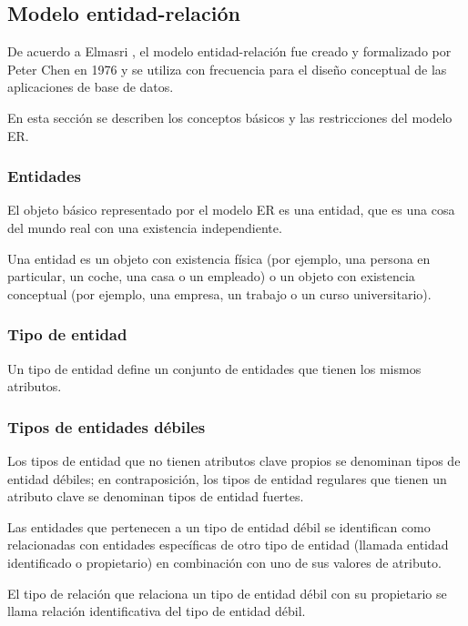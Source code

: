 
\subsection{Modelo entidad-relación}

De acuerdo a Elmasri \cite{ramez_elmasri_fundamentos_nodate}, el modelo entidad-relación fue creado y formalizado por Peter Chen en 1976\cite{chen_entity-relationship_nodate} y se utiliza con frecuencia para el diseño conceptual de las aplicaciones de base de datos. 


En esta sección se describen los conceptos básicos y las restricciones del modelo ER. 

\subsubsection{Entidades}
El objeto básico representado por el modelo ER es una entidad, que es una cosa del mundo real con una existencia independiente.


Una entidad es un objeto con existencia física (por ejemplo, una persona en particular, un coche, una casa o un empleado) o un objeto con existencia conceptual (por ejemplo, una empresa, un trabajo o un curso universitario).

\subsubsection*{Tipo de entidad}

Un tipo de entidad define un conjunto de entidades que tienen los mismos atributos.


\subsubsection*{Tipos de entidades débiles}

Los tipos de entidad que no tienen atributos clave propios se denominan tipos de entidad débiles; en contraposición, los tipos de entidad regulares que tienen un atributo clave se denominan tipos de entidad fuertes.


Las entidades que pertenecen a un tipo de entidad débil se identifican como relacionadas con entidades específicas de otro tipo de entidad (llamada entidad identificado o propietario) en combinación con uno de sus valores de atributo.


El tipo de relación que relaciona un tipo de entidad débil con su propietario se llama relación identificativa del tipo de entidad débil. 


